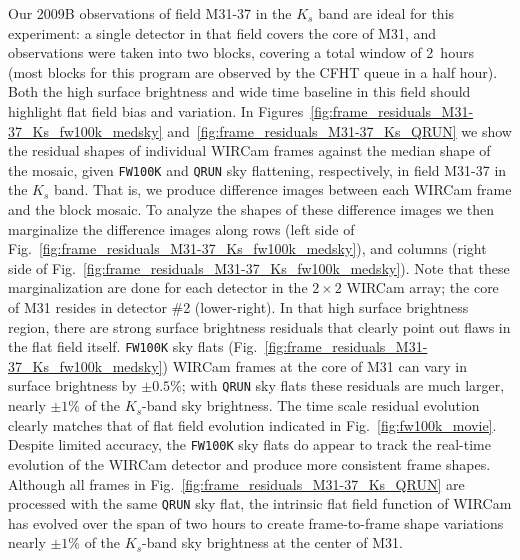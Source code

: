 \documentclass[iop]{emulateapj}
\newcommand{\Fig}[1]{Fig.~\ref{fig:#1}}  %
\begin{document}
Our 2009B observations of field M31-37 in the $K_s$ band are ideal for this experiment: a single detector in that field covers the core of M31, and observations were taken into two blocks, covering a total window of 2~hours (most blocks for this program are observed by the CFHT queue in a half hour).
Both the high surface brightness and wide time baseline in this field should highlight flat field bias and variation.
In Figures~\ref{fig:frame_residuals_M31-37_Ks_fw100k_medsky} and~\ref{fig:frame_residuals_M31-37_Ks_QRUN} we show the residual shapes of individual WIRCam frames against the median shape of the mosaic, given \texttt{FW100K} and \texttt{QRUN} sky flattening, respectively, in field M31-37 in the $K_s$ band.
That is, we produce difference images between each WIRCam frame and the block mosaic.
To analyze the shapes of these difference images we then marginalize the difference images along rows (left side of \Fig{frame_residuals_M31-37_Ks_fw100k_medsky}), and columns (right side of \Fig{frame_residuals_M31-37_Ks_fw100k_medsky}).
Note that these marginalization are done for each detector in the $2\times2$ WIRCam array; the core of M31 resides in detector \#2 (lower-right).
In that high surface brightness region, there are strong surface brightness residuals that clearly point out flaws in the flat field itself.
\texttt{FW100K} sky flats (\Fig{frame_residuals_M31-37_Ks_fw100k_medsky}) WIRCam frames at the core of M31 can vary in surface brightness by $\pm 0.5\%$; with \texttt{QRUN} sky flats these residuals are much larger, nearly $\pm 1\%$ of the $K_s$-band sky brightness.
The time scale residual evolution clearly matches that of flat field evolution indicated in \Fig{fw100k_movie}.
Despite limited accuracy, the \texttt{FW100K} sky flats do appear to track the real-time evolution of the WIRCam detector and produce more consistent frame shapes.
Although all frames in \Fig{frame_residuals_M31-37_Ks_QRUN} are processed with the same \texttt{QRUN} sky flat, the intrinsic flat field function of WIRCam has evolved over the span of two hours to create frame-to-frame shape variations nearly $\pm 1\%$ of the $K_s$-band sky brightness at the center of M31.
\end{document}
